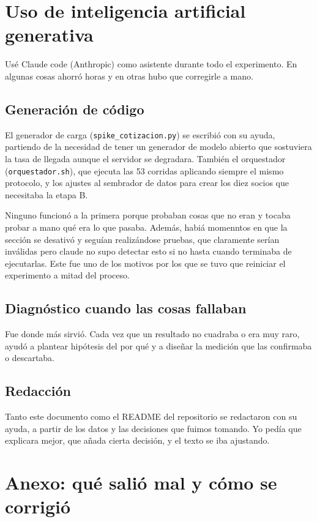 \documentclass[11pt]{article}
\begin{document}
\section{Uso de inteligencia artificial generativa}

Usé Claude code (Anthropic) como asistente durante todo el experimento. En algunas cosas ahorró horas y en otras hubo que corregirle
a mano.

\subsection{Generación de código}

El generador de carga (\texttt{spike\_cotizacion.py}) se escribió con su ayuda, partiendo de la
necesidad de tener un generador de modelo abierto que sostuviera la tasa de llegada
aunque el servidor se degradara. También el orquestador (\texttt{orquestador.sh}), que ejecuta las
53 corridas aplicando siempre el mismo protocolo, y los ajustes al sembrador de datos para crear los
diez socios que necesitaba la etapa B.

Ninguno funcionó a la primera porque probaban cosas que no eran y tocaba probar a mano qué era lo que pasaba. Además, habiá momenntos en que la sección se desativó y seguían realizándose pruebas, que claramente serían inválidas pero claude no supo detectar esto si no hasta cuando terminaba de ejecutarlas. Este fue uno de los motivos por los que se tuvo que reiniciar el experimento a mitad del proceso.

\subsection{Diagnóstico cuando las cosas fallaban}

Fue donde más sirvió. Cada vez que un resultado no cuadraba o era muy raro, ayudó a plantear hipótesis del por qué y
a diseñar la medición que las confirmaba o descartaba.


\subsection{Redacción}

Tanto este documento como el README del repositorio se redactaron con su ayuda, a partir de los
datos y las decisiones que fuimos tomando. Yo pedía que explicara mejor, que añada cierta decisión, y el texto se
iba ajustando.


\section{Anexo: qué salió mal y cómo se corrigió}
\end{document}
